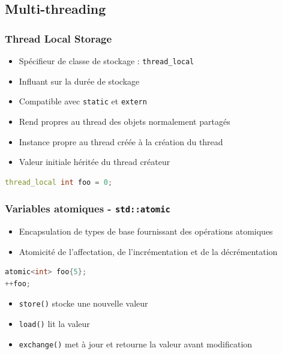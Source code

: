 \documentclass[C++.tex]{subfiles}
\begin{document}
\subsection*{Multi-threading}
\begin{frame}[fragile]
	\frametitle{Thread Local Storage}
	\begin{itemize}
		\item Spécifieur de classe de stockage : \lstinline|thread_local|
		\item Influant sur la durée de stockage
		\item Compatible avec \lstinline|static| et \lstinline|extern|
		\item Rend propres au thread des objets normalement partagés


		\item Instance propre au thread créée à la création du thread
		\item Valeur initiale héritée du thread créateur
	\end{itemize}

	\begin{lstlisting}[language=C++]
thread_local int foo = 0;\end{lstlisting}
\end{frame}

\begin{frame}[fragile]
	\frametitle{Variables atomiques - \lstinline|std::atomic|}
	\begin{itemize}
		\item Encapsulation de types de base fournissant des opérations atomiques
		\item Atomicité de l'affectation, de l'incrémentation et de la décrémentation
	\end{itemize}

	\begin{lstlisting}[language=C++]
atomic<int> foo{5};
++foo; \end{lstlisting}

	\begin{itemize}
		\item \lstinline|store()| stocke une nouvelle valeur
		\item \lstinline|load()| lit la valeur
		\item \lstinline|exchange()| met à jour et retourne la valeur avant modification
	\end{itemize}
\end{frame}
\end{document}
